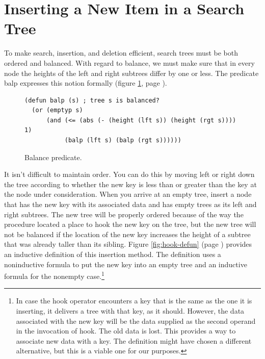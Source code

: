 \section{Inserting a New Item in a Search Tree}

To make search, insertion, and deletion efficient,
search trees must be both ordered and balanced.
With regard to balance,
we must make sure that in every node the heights of the left and right subtrees
differ by one or less.
\label{balance-defun}The predicate \textsf{balp} expresses this notion formally
(figure \ref{fig:balance-defun}, page \pageref{fig:balance-defun}).

\begin{figure}
\begin{center}
\begin{code}
\begin{verbatim}
(defun balp (s) ; tree s is balanced?
  (or (emptyp s)
      (and (<= (abs (- (height (lft s)) (height (rgt s)))) 1)
           (balp (lft s) (balp (rgt s))))))
\end{verbatim}
\end{code}
\end{center}
\caption{Balance predicate.}
\label{fig:balance-defun}
\end{figure}

It isn't difficult to maintain order.
You can do this by moving left or right down the tree according
to whether the new key is less than or greater than the key at the node
under consideration.
When you arrive at an empty tree,
insert a node that has the new key
with its associated data
and has empty trees as its left and right subtrees.
The new tree will be properly ordered because
of the way the procedure located a place to
hook the new key on the tree,
but the new tree will not be balanced if
the location of the new key increases the height
of a subtree that was already taller than its sibling.
Figure \ref{fig:hook-defun} (page \pageref{fig:hook-defun}) provides
an inductive definition of this insertion method.
The definition uses a noninductive formula
to put the new key into an empty tree
and an inductive formula for the nonempty case.\footnote{In
\label{same-key-new-data}
case the \textsf{hook} operator encounters a key that is the same
as the one it is inserting, it delivers a tree with that key, as it should.
However, the data associated with the new key will be the data supplied
as the second operand in the invocation of \textsf{hook}.
The old data is lost.
This provides a way to associate new data with a key.
The definition might have chosen a different alternative,
but this is a viable one for our purposes.}

